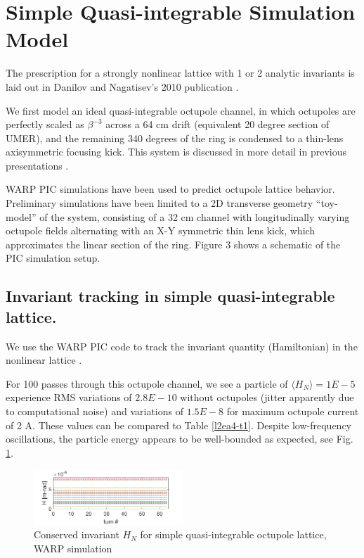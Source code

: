 \section{Simple Quasi-integrable Simulation Model}

The prescription for a strongly nonlinear lattice with 1 or 2 analytic invariants is laid out in Danilov and Nagatisev's 2010 publication \cite{Danilov2010}.

We first model an ideal quasi-integrable octupole channel, in which octupoles are perfectly scaled as $\beta^{-3}$ across a 64 cm drift (equivalent 20 degree section of UMER), and the remaining 340 degrees of the ring is condensed to a thin-lens axisymmetric focusing kick. This system is discussed in more detail in previous presentations \cite{KRAAC}.

WARP PIC simulations have been used to predict octupole lattice behavior. Preliminary simulations have been limited to a 2D transverse geometry “toy-model” of the system, consisting of a 32 cm channel with longitudinally varying octupole fields alternating with an X-Y symmetric thin lens kick, which approximates the linear section of the ring. Figure 3 shows a schematic of the PIC simulation setup.

\subsection{Invariant tracking in simple quasi-integrable lattice.}

We use the WARP PIC code to track the invariant quantity (Hamiltonian) in the nonlinear lattice \cite{warp}. 

For 100 passes through this octupole channel, we see a particle of $\langle H_N\rangle =1E-5$ experience RMS variations of $2.8E-10$ without octupoles (jitter apparently due to computational noise) and variations of $1.5E-8$ for maximum octupole current of 2 A. These values can be compared to Table \ref{l2ea4-t1}. Despite low-frequency oscillations, the particle energy appears to be well-bounded as expected, see Fig. \ref{toyinvar}.

\begin{figure}[]
   \centering
    \includegraphics[width=0.5\textwidth]{5.figures/HvsZ_crun1_toylattice.png}
 	\caption{Conserved invariant $H_N$ for simple quasi-integrable octupole lattice, WARP simulation}
   \label{toyinvar}
\end{figure}



